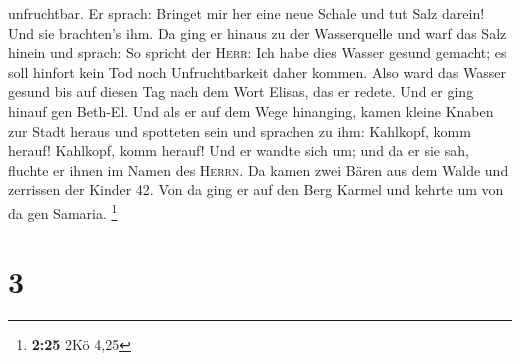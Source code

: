 unfruchtbar.  Er sprach: Bringet mir her eine neue Schale
und tut Salz darein! Und sie brachten's ihm.  Da ging er
hinaus zu der Wasserquelle und warf das Salz hinein und sprach: So
spricht der \textsc{Herr}: Ich habe dies Wasser gesund gemacht; es soll
hinfort kein Tod noch Unfruchtbarkeit daher kommen.  Also
ward das Wasser gesund bis auf diesen Tag nach dem Wort Elisas, das er
redete.  Und er ging hinauf gen Beth-El. Und als er auf
dem Wege hinanging, kamen kleine Knaben zur Stadt heraus und spotteten
sein und sprachen zu ihm: Kahlkopf, komm herauf! Kahlkopf, komm herauf!
 Und er wandte sich um; und da er sie sah, fluchte er
ihnen im Namen des \textsc{Herrn}. Da kamen zwei Bären aus dem Walde und
zerrissen der Kinder 42.  Von da ging er auf den Berg
Karmel und kehrte um von da gen Samaria. \footnote{\textbf{2:25} 2Kö
  4,25}

\hypertarget{section-1}{%
\section{3}\label{section-1}}

